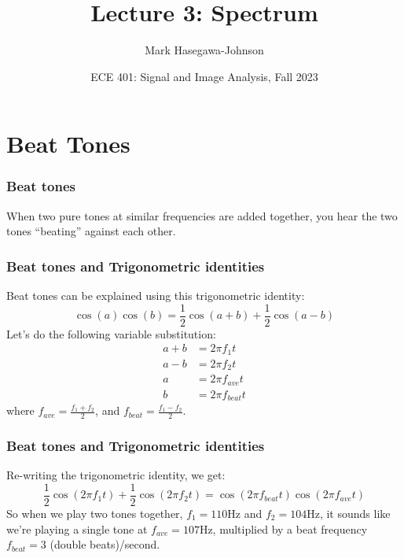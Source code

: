 \documentclass{beamer}
\title{Lecture 3: Spectrum}
\author{Mark Hasegawa-Johnson}
\date{ECE 401: Signal and Image Analysis, Fall 2023}
\begin{document}
\begin{frame}
  \maketitle
\end{frame}

\begin{frame}
  \tableofcontents
\end{frame}

\section[Beating]{Beat Tones}
\setcounter{subsection}{1}

\begin{frame}
  \frametitle{Beat tones}

  When two pure tones at similar frequencies are added together, you hear the  two tones
  ``beating'' against each other.
  \vspace*{1cm}
  \centerline{}
\end{frame}

\begin{frame}
  \frametitle{Beat tones and Trigonometric identities}

  Beat tones can be explained using this trigonometric identity:
  \[
  \cos(a)\cos(b)=\frac{1}{2}\cos(a+b)+\frac{1}{2}\cos(a-b)
  \]
  Let's do the following variable substitution:
  \begin{align*}
    a+b &= 2\pi f_1 t\\
    a-b &= 2\pi f_2 t\\
    a &= 2\pi f_{ave}t\\
    b &= 2\pi f_{beat}t
  \end{align*}
  where $f_{ave}=\frac{f_1+f_2}{2}$, and $f_{beat}=\frac{f_1-f_2}{2}$.
\end{frame}

\begin{frame}
  \frametitle{Beat tones and Trigonometric identities}

  Re-writing the trigonometric identity, we get:
  \[
  \frac{1}{2}\cos(2\pi f_1t)+\frac{1}{2}\cos(2\pi f_2 t) = \cos(2\pi f_{beat}t)\cos(2\pi f_{ave}t)
  \]
  So when we play two tones together, $f_1=110$Hz and $f_2=104$Hz, it
  sounds like we're playing a single tone at $f_{ave}=107$Hz,
  multiplied by a beat frequency $f_{beat}=3$ (double beats)/second.
\end{frame}
\end{document}
